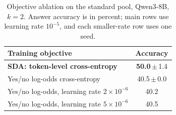 \begin{table}[tbp]
\centering
\caption{Objective ablation on the standard pool, Qwen3-8B, $k=2$. Answer accuracy is in percent; main rows use
learning rate $10^{-5}$, and each smaller-rate row uses one seed.}
\label{tab:objective}
\small
\setlength{\tabcolsep}{6pt}
\begin{tabular}{lc}
\toprule
Training objective & Accuracy \\
\midrule
\textbf{SDA: token-level cross-entropy} & \textbf{50.0}\,$\pm$\,1.4 \\
Yes/no log-odds cross-entropy & 40.5\,$\pm$\,0.0 \\
Yes/no log-odds, learning rate $2\times10^{-6}$ & 40.2 \\
Yes/no log-odds, learning rate $5\times10^{-6}$ & 40.5 \\
\bottomrule
\end{tabular}
\end{table}
